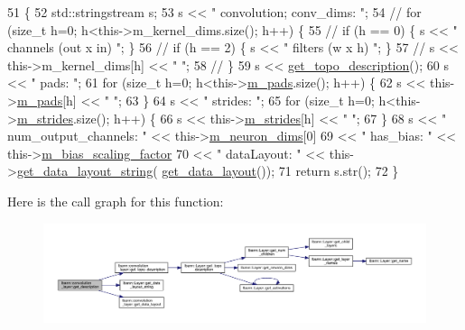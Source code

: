 \begin{DoxyCode}
51                                              \{
52     std::stringstream s;
53     s << \textcolor{stringliteral}{" convolution; conv\_dims: "};
54     \textcolor{comment}{// for (size\_t h=0; h<this->m\_kernel\_dims.size(); h++) \{}
55     \textcolor{comment}{//   if (h == 0) \{ s << " channels (out x in) "; \}}
56     \textcolor{comment}{//   if (h == 2) \{ s << " filters (w x h) "; \}}
57     \textcolor{comment}{//   s << this->m\_kernel\_dims[h] << " ";}
58     \textcolor{comment}{// \}}
59     s << \hyperlink{classlbann_1_1convolution__layer_a5af5bb8b7fb68ed4e5085be676788eed}{get\_topo\_description}();
60     s << \textcolor{stringliteral}{" pads: "};
61     \textcolor{keywordflow}{for} (\textcolor{keywordtype}{size\_t} h=0; h<this->\hyperlink{classlbann_1_1base__convolution__layer_a9732a8a0170a413bf0cde0128ad2a571}{m\_pads}.size(); h++) \{
62       s << this->\hyperlink{classlbann_1_1base__convolution__layer_a9732a8a0170a413bf0cde0128ad2a571}{m\_pads}[h] << \textcolor{stringliteral}{" "};
63     \}
64     s << \textcolor{stringliteral}{" strides: "};
65     \textcolor{keywordflow}{for} (\textcolor{keywordtype}{size\_t} h=0; h<this->\hyperlink{classlbann_1_1base__convolution__layer_a2429495822363e41f1f6b96a6b430445}{m\_strides}.size(); h++) \{
66       s << this->\hyperlink{classlbann_1_1base__convolution__layer_a2429495822363e41f1f6b96a6b430445}{m\_strides}[h] << \textcolor{stringliteral}{" "};
67     \}
68     s << \textcolor{stringliteral}{" num\_output\_channels: "} << this->\hyperlink{classlbann_1_1Layer_abb34bb8031f57a483e2e327a5f229f48}{m\_neuron\_dims}[0]
69       << \textcolor{stringliteral}{" has\_bias: "} << this->\hyperlink{classlbann_1_1base__convolution__layer_a5abe0bcd128b66a41fa481b28a9c2104}{m\_bias\_scaling\_factor}
70       << \textcolor{stringliteral}{" dataLayout: "} << this->\hyperlink{classlbann_1_1Layer_ae3f4a5602df821f4221614b1e3782dc1}{get\_data\_layout\_string}(
      \hyperlink{classlbann_1_1convolution__layer_a496e4bc7465269961603aba305700b84}{get\_data\_layout}());
71     \textcolor{keywordflow}{return} s.str();
72   \}
\end{DoxyCode}
Here is the call graph for this function\+:\nopagebreak
\begin{figure}[H]
\begin{center}
\leavevmode
\includegraphics[width=350pt]{classlbann_1_1convolution__layer_abce67d7e977d148093798936aff8ee5e_cgraph}
\end{center}
\end{figure}
\mbox{\label{classlbann_1_1convolution__layer_a5af5bb8b7fb68ed4e5085be676788eed}} 
